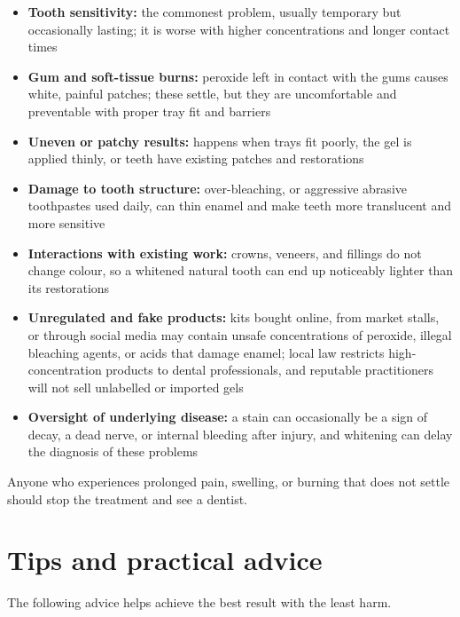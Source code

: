 \begin{itemize}
    \item \textbf{Tooth sensitivity:} the commonest problem, usually temporary but occasionally lasting; it is worse with higher concentrations and longer contact times
    \item \textbf{Gum and soft-tissue burns:} peroxide left in contact with the gums causes white, painful patches; these settle, but they are uncomfortable and preventable with proper tray fit and barriers
    \item \textbf{Uneven or patchy results:} happens when trays fit poorly, the gel is applied thinly, or teeth have existing patches and restorations
    \item \textbf{Damage to tooth structure:} over-bleaching, or aggressive abrasive toothpastes used daily, can thin enamel and make teeth more translucent and more sensitive
    \item \textbf{Interactions with existing work:} crowns, veneers, and fillings do not change colour, so a whitened natural tooth can end up noticeably lighter than its restorations
    \item \textbf{Unregulated and fake products:} kits bought online, from market stalls, or through social media may contain unsafe concentrations of peroxide, illegal bleaching agents, or acids that damage enamel; local law restricts high-concentration products to dental professionals, and reputable practitioners will not sell unlabelled or imported gels
    \item \textbf{Oversight of underlying disease:} a stain can occasionally be a sign of decay, a dead nerve, or internal bleeding after injury, and whitening can delay the diagnosis of these problems
\end{itemize}

Anyone who experiences prolonged pain, swelling, or burning that does not settle should stop the treatment and see a dentist.

\section*{Tips and practical advice}
The following advice helps achieve the best result with the least harm.

